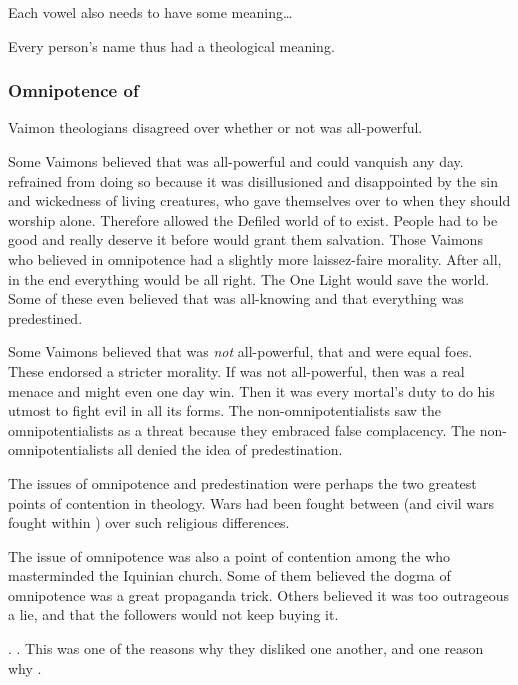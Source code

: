 Each vowel also needs to have some meaning\ldots{}

Every person's name thus had a theological meaning. 





\subsubsection{Omnipotence of \Iquin}
Vaimon theologians disagreed over whether or not \iquin was all-powerful. 

Some Vaimons believed that \Iquin was all-powerful and could vanquish \itzach any day. 
\Iquin refrained from doing so because it was disillusioned and disappointed by the sin and wickedness of living creatures, who gave themselves over to \itzach when they should worship \iquin alone. 
Therefore \iquin allowed the Defiled world of \Gehinnom to exist.
People had to be good and really deserve it before \iquin would grant them salvation.
Those Vaimons who believed in omnipotence had a slightly more laissez-faire morality.
After all, in the end everything would be all right. 
The One Light would save the world. 
Some of these even believed that \iquin was all-knowing and that everything was predestined. 

Some Vaimons believed that \Iquin was \emph{not} all-powerful, that \iquin and \itzach were equal foes. 
These endorsed a stricter morality.
If \iquin was not all-powerful, then \itzach was a real menace and might even one day win.
Then it was every mortal's duty to do his utmost to fight evil in all its forms. 
The non-omnipotentialists saw the omnipotentialists as a threat because they embraced false complacency. 
The non-omnipotentialists all denied the idea of predestination. 

The issues of omnipotence and predestination were perhaps the two greatest points of contention in \iquinian theology.
Wars had been fought between \vclans (and civil wars fought within \vclans) over such religious differences.

The issue of omnipotence was also a point of contention among the \resphain who masterminded the Iquinian church.
Some of them believed the dogma of omnipotence was a great propaganda trick.
Others believed it was too outrageous a lie, and that the followers would not keep buying it. 

\ClanTelcra {}. 
\ClanRedcor {}. 
This was one of the reasons why they disliked one another, and one reason why .

